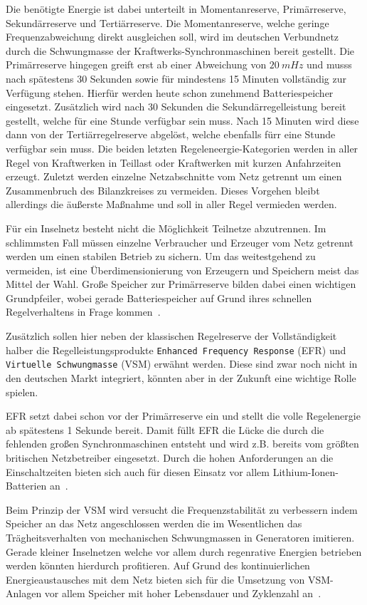 Die benötigte Energie ist dabei unterteilt in Momentanreserve, Primärreserve, Sekundärreserve 
und Tertiärreserve.
Die Momentanreserve, welche geringe Frequenzabweichung direkt ausgleichen soll, wird im deutschen Verbundnetz
durch die Schwungmasse der Kraftwerks-Synchronmaschinen bereit gestellt.
Die Primärreserve hingegen greift erst ab einer Abweichung von $20\ mHz$ und musss nach spätestens 30 Sekunden
sowie für mindestens 15 Minuten vollständig zur Verfügung stehen.
Hierfür werden heute schon zunehmend Batteriespeicher eingesetzt.
Zusätzlich wird nach 30 Sekunden die Sekundärregelleistung bereit gestellt, welche für eine Stunde verfügbar sein muss.
Nach 15 Minuten wird diese dann von der Tertiärregelreserve abgelöst, welche ebenfalls fürr eine Stunde verfügbar sein muss.
Die beiden letzten Regeleneergie-Kategorien werden in aller Regel von Kraftwerken in Teillast oder Kraftwerken mit kurzen Anfahrzeiten
erzeugt.
Zuletzt werden einzelne Netzabschnitte vom Netz getrennt um einen Zusammenbruch des Bilanzkreises zu vermeiden.
Dieses Vorgehen bleibt allerdings die äußerste Maßnahme und soll in aller Regel vermieden werden.

Für ein Inselnetz besteht nicht die Möglichkeit Teilnetze abzutrennen. 
Im schlimmsten Fall müssen einzelne Verbraucher und Erzeuger vom Netz getrennt werden um einen stabilen Betrieb zu sichern.
Um das weitestgehend zu vermeiden, ist eine Überdimensionierung von Erzeugern und Speichern meist das Mittel der Wahl.
Große Speicher zur Primärreserve bilden dabei einen wichtigen Grundpfeiler, wobei gerade Batteriespeicher 
auf Grund ihres schnellen Regelverhaltens in Frage kommen~\parencite{Itschner}.

Zusätzlich sollen hier neben der klassischen Regelreserve der Vollständigkeit halber die Regelleistungsprodukte \texttt{Enhanced Frequency Response}
(EFR) und \texttt{Virtuelle Schwungmasse} (VSM) erwähnt werden.
Diese sind zwar noch nicht in den deutschen Markt integriert, könnten aber in der Zukunft eine wichtige Rolle spielen.

EFR setzt dabei schon vor der Primärreserve ein und stellt die volle Regelenergie ab spätestens 1 Sekunde bereit.
Damit füllt EFR die Lücke die durch die fehlenden großen Synchronmaschinen entsteht und wird z.B. bereits vom 
größten britischen Netzbetreiber eingesetzt.
Durch die hohen Anforderungen an die Einschaltzeiten bieten sich auch für diesen Einsatz vor allem
Lithium-Ionen-Batterien an~\parencite{mantar_gundogdu_battery_2018}.

Beim Prinzip der VSM wird versucht die Frequenzstabilität zu verbessern indem Speicher an das Netz angeschlossen werden
die im Wesentlichen das Trägheitsverhalten von mechanischen Schwungmassen in Generatoren imitieren.
Gerade kleiner Inselnetzen welche vor allem durch regenrative Energien betrieben werden könnten hierdurch profitieren.
Auf Grund des kontinuierlichen Energieaustausches mit dem Netz bieten sich für die Umsetzung von VSM-Anlagen vor allem
Speicher mit hoher Lebensdauer und Zyklenzahl an~\parencite{boxleitner_virtuelle_2009}.

